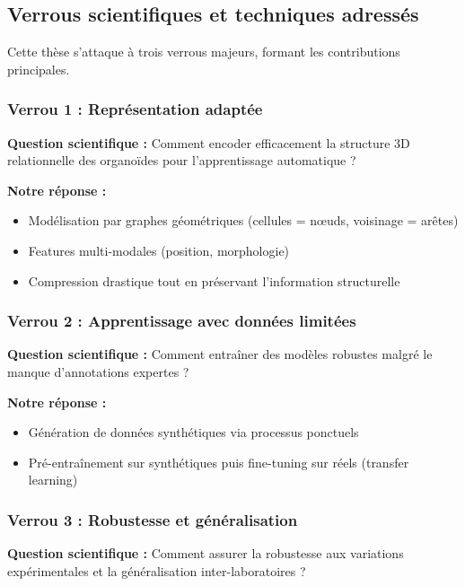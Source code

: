 \subsection{Verrous scientifiques et techniques adressés}

Cette thèse s'attaque à trois verrous majeurs, formant les contributions principales.

\subsubsection{Verrou 1 : Représentation adaptée}

\textbf{Question scientifique :} Comment encoder efficacement la structure 3D relationnelle des organoïdes pour l'apprentissage automatique ?

\textbf{Notre réponse :}
\begin{itemize}
    \item Modélisation par graphes géométriques (cellules = nœuds, voisinage = arêtes)
    \item Features multi-modales (position, morphologie)
    \item Compression drastique tout en préservant l'information structurelle
\end{itemize}

\subsubsection{Verrou 2 : Apprentissage avec données limitées}

\textbf{Question scientifique :} Comment entraîner des modèles robustes malgré le manque d'annotations expertes ?

\textbf{Notre réponse :}
\begin{itemize}
    \item Génération de données synthétiques via processus ponctuels
    \item Pré-entraînement sur synthétiques puis fine-tuning sur réels (transfer learning)
\end{itemize}

\subsubsection{Verrou 3 : Robustesse et généralisation}

\textbf{Question scientifique :} Comment assurer la robustesse aux variations expérimentales et la généralisation inter-laboratoires ?

